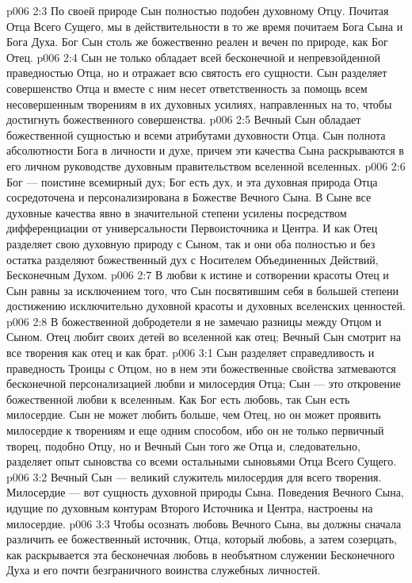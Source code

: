 \vs p006 2:3 По своей природе Сын полностью подобен духовному Отцу. Почитая Отца Всего Сущего, мы в действительности в то же время почитаем Бога Сына и Бога Духа. Бог Сын столь же божественно реален и вечен по природе, как Бог Отец.
\vs p006 2:4 Сын не только обладает всей бесконечной и непревзойденной праведностью Отца, но и отражает всю святость его сущности. Сын разделяет совершенство Отца и вместе с ним несет ответственность за помощь всем несовершенным творениям в их духовных усилиях, направленных на то, чтобы достигнуть божественного совершенства.
\vs p006 2:5 Вечный Сын обладает божественной сущностью и всеми атрибутами духовности Отца. Сын  полнота абсолютности Бога в личности и духе, причем эти качества Сына раскрываются в его личном руководстве духовным правительством вселенной вселенных.
\vs p006 2:6 Бог --- поистине всемирный дух; Бог есть дух, и эта духовная природа Отца сосредоточена и персонализирована в Божестве Вечного Сына. В Сыне все духовные качества явно в значительной степени усилены посредством дифференциации от универсальности Первоисточника и Центра. И как Отец разделяет свою духовную природу с Сыном, так и они оба полностью и без остатка разделяют божественный дух с Носителем Объединенных Действий, Бесконечным Духом.
\vs p006 2:7 В любви к истине и сотворении красоты Отец и Сын равны за исключением того, что Сын  посвятившим себя в большей степени достижению исключительно духовной красоты и духовных вселенских ценностей.
\vs p006 2:8 В божественной добродетели я не замечаю разницы между Отцом и Сыном. Отец любит своих детей во вселенной как отец; Вечный Сын смотрит на все творения как отец и как брат.
\vs p006 3:1 Сын разделяет справедливость и праведность Троицы с Отцом, но в нем эти божественные свойства затмеваются бесконечной персонализацией любви и милосердия Отца; Сын --- это откровение божественной любви к вселенным. Как Бог есть любовь, так Сын есть милосердие. Сын не может любить больше, чем Отец, но он может проявить милосердие к творениям и еще одним способом, ибо он не только первичный творец, подобно Отцу, но и Вечный Сын того же Отца и, следовательно, разделяет опыт сыновства со всеми остальными сыновьями Отца Всего Сущего.
\vs p006 3:2 Вечный Сын --- великий служитель милосердия для всего творения. Милосердие --- вот сущность духовной природы Сына. Поведения Вечного Сына, идущие по духовным контурам Второго Источника и Центра, настроены на милосердие.
\vs p006 3:3 Чтобы осознать любовь Вечного Сына, вы должны сначала различить ее божественный источник, Отца, который  любовь, а затем созерцать, как раскрывается эта бесконечная любовь в необъятном служении Бесконечного Духа и его почти безграничного воинства служебных личностей.
